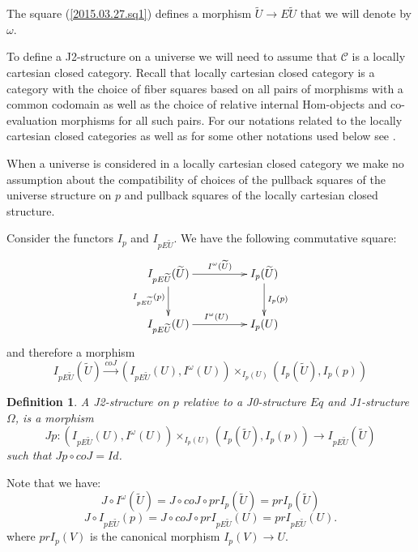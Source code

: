 \documentclass[12pt]{article}
\numberwithin{equation}{section}
\newenvironment{eq}{\begin{equation}}{\end{equation}}
\newtheorem{definition}[proposition]{Definition}
\newcommand{\llabel}[1]{\label{#1}}
\newcommand{\sr}{\rightarrow}
\newcommand{\lr}{\longrightarrow}
\newcommand{\wt}{\widetilde}
\begin{document}
The square (\ref{2015.03.27.sq1}) defines a morphism $\wt{U}\sr E\wt{U}$ that
we will denote by $\omega$.



To define a J2-structure on a universe we will need to assume that $\mathcal C$
is a locally cartesian closed category.  Recall that locally cartesian closed
category is a category with the choice of fiber squares based on all pairs of
morphisms with a common codomain as well as the choice of relative internal
Hom-objects and co-evaluation morphisms for all such pairs. For our notations
related to the locally cartesian closed categories as well as for some other
notations used below see \cite{fromunivwithPi}.

When a universe is considered in a locally cartesian closed category we make no
assumption about the compatibility of choices of the pullback squares of the
universe structure on $p$ and pullback squares of the locally cartesian closed
structure.

Consider the functors $I_{p}$ and $I_{pE\wt{U}}$. We have the following
commutative square:
%
\begin{eq}\llabel{2010.sq1}
\begin{xy}
          \xymatrix@C=4pc{ I_{pE\wt{U}}(\wt{U}) \ar[r]^-{I^{\omega}(\wt{U})}
            \ar[d]_{I_{pE\wt{U}}(p)} & I_p(\wt{U})
            \ar[d]^{I_p(p)}\\ I_{pE\wt{U}}(U) \ar[r]^{I^{\omega}(U)} & I_p(U) }
\end{xy}
\end{eq}
%
and therefore a morphism
%
$$I_{pE\wt{U}}(\wt{U}) \stackrel{coJ}{\lr} (I_{pE\wt{U}}(U), I^{\omega}(U))
\times_{I_p(U)} (I_p(\wt{U}), I_p(p))
$$
%
\begin{definition}
\llabel{2015.03.27.def6} A J2-structure on $p$ relative to a J0-structure $Eq$
and J1-structure $\Omega$, is a morphism
%
$$ Jp:( I_{pE\wt{U}}(U), I^{\omega}(U))\times_{I_p(U)} (I_p(\wt{U}), I_p(p))\sr
I_{pE\wt{U}}(\wt{U}) $$
%
such that $Jp\circ coJ = Id$.
\end{definition}
%
Note that we have:
%
\begin{eq}
\llabel{2015.04.04.eq1} J\circ I^{\omega}(\wt{U})=J\circ coJ\circ
prI_p(\wt{U})=prI_{p}(\wt{U})
\end{eq}
%
\begin{eq}
\llabel{2015.04.04.eq2} J\circ I_{pE\wt{U}}(p)=J\circ coJ\circ
prI_{pE\wt{U}}(U)=prI_{pE\wt{U}}(U).
\end{eq}
%
where $prI_p(V)$ is the canonical morphism $I_p(V)\sr U$.
\end{document}
